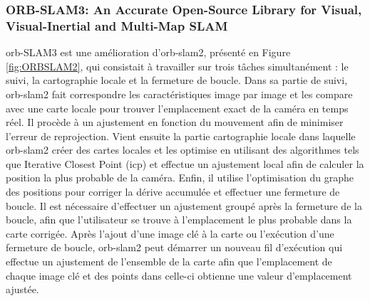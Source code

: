 \documentclass[11pt]{article}
\begin{document}
        \subsubsection{ORB-SLAM3: An Accurate Open-Source Library for Visual, Visual-Inertial and Multi-Map SLAM}
          \acrshort{orb}-SLAM3 \cite{camposORBSLAM3AccurateOpenSource2021} est une amélioration d'\acrshort{orb}-\acrshort{slam}2, présenté 
          en Figure \ref{fig:ORBSLAM2}, qui consistait à travailler sur trois tâches simultanément : 
          le suivi, la cartographie locale et la fermeture de boucle. Dans sa partie de suivi, \acrshort{orb}-\acrshort{slam}2 fait correspondre les caractéristiques image 
          par image et les compare avec une carte locale pour trouver l'emplacement exact de la caméra en temps réel. Il procède à un ajustement 
          en fonction du mouvement afin de minimiser l'erreur de reprojection. Vient ensuite la partie cartographie locale 
          dans laquelle \acrshort{orb}-\acrshort{slam}2 
          créer des cartes locales et les optimise en utilisant des algorithmes tels que Iterative Closest Point (\acrshort{icp}) et effectue un ajustement 
          local afin de calculer la position la plus probable de la caméra. Enfin, il utilise l'optimisation du graphe des positions 
          pour corriger la dérive accumulée et effectuer une fermeture de boucle. Il est nécessaire d'effectuer un ajustement groupé
          après la fermeture de la boucle, afin que l'utilisateur se trouve à l'emplacement le plus probable dans la carte corrigée. 
          Après l'ajout d'une image clé à la carte ou l'exécution d'une fermeture de boucle, 
          \acrshort{orb}-\acrshort{slam}2 peut démarrer un nouveau fil d'exécution qui effectue un ajustement de l'ensemble de la carte afin que 
          l'emplacement de chaque image clé et des points dans celle-ci obtienne une valeur d'emplacement ajustée.
\end{document}
